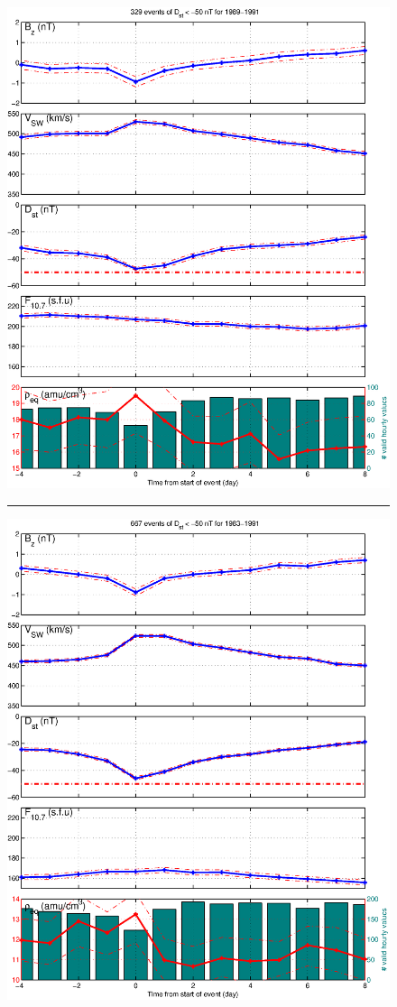 \documentclass[10pt,twocolumn]{article}
\begin{document}
\begin{figure}[tp!]
\centering
\includegraphics[scale=0.40]{paperfigures/stormavs-dst-50-tak.eps}
\rule[1ex]{5cm}{1pt}
\includegraphics[scale=0.40]{paperfigures/stormavs-dst-day.eps}

\end{figure}
\end{document}
